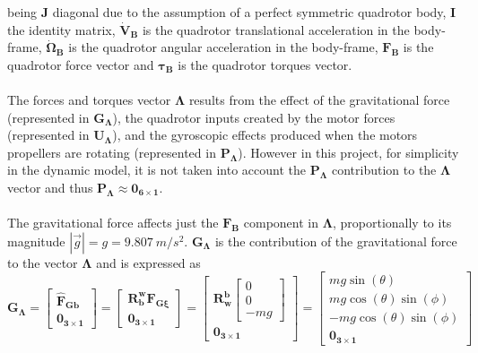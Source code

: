being $\mathbf{J}$ diagonal due to the assumption of a perfect symmetric quadrotor body, $\mathbf{I}$ the identity matrix, $\mathbf{\dot{V}_{B}}$ is the quadrotor translational acceleration in the body-frame, $\mathbf{\dot{\Omega}_B}$ is the quadrotor angular acceleration in the body-frame, $\mathbf{F_{B}}$ is the quadrotor force vector and $\mathbf{\tau_{B}}$ is the quadrotor torques vector.
\\\\
The forces and torques vector $\mathbf{\Lambda}$ results from the effect of the gravitational force (represented in $\mathbf{G_{\Lambda}}$), the quadrotor inputs created by the motor forces (represented in $\mathbf{U_{\Lambda}}$), and the gyroscopic effects produced when the motors propellers are rotating (represented in $\mathbf{P_{\Lambda}}$). However in this project, for simplicity in the dynamic model, it is not taken into account the $\mathbf{P_{\Lambda}}$ contribution to the $\mathbf{\Lambda}$ vector and thus $\mathbf{P_{\Lambda}} \approx \mathbf{0_{6\times 1}}$.
\\\\
The gravitational force affects just the $\mathbf{F_B}$ component in $\mathbf{\Lambda}$, proportionally to its magnitude $|\vec{g}|= g = 9.807\ m/s^{2}$. $\mathbf{G_{\Lambda}}$ is the contribution of the gravitational force to the vector $\mathbf{\Lambda}$ and is expressed as 
\begin{equation}
\mathbf{G_{\Lambda}}= \begin{bmatrix}
\mathbf{\hat{F}_{Gb}} \\ \mathbf{0_{3\times 1}}
\end{bmatrix} = \begin{bmatrix}
\mathbf{R_{b}^{w}}\mathbf{F_{G\xi}} \\ \mathbf{0_{3\times 1}}
\end{bmatrix} = 
\begin{bmatrix}
\mathbf{R_{w}^{b}} 
\begin{bmatrix}
0 \\[5pt] 0 \\[5pt] -m g
\end{bmatrix} \\[5pt]
\mathbf{0_{3\times 1}}
\end{bmatrix} =\begin{bmatrix}
m g \sin(\theta) \\[5pt]
m g \cos(\theta)\sin(\phi) \\[5pt]
- m g \cos(\theta)\sin(\phi) \\[5pt]
\mathbf{0_{3\times 1}}
\end{bmatrix}
\end{equation}
